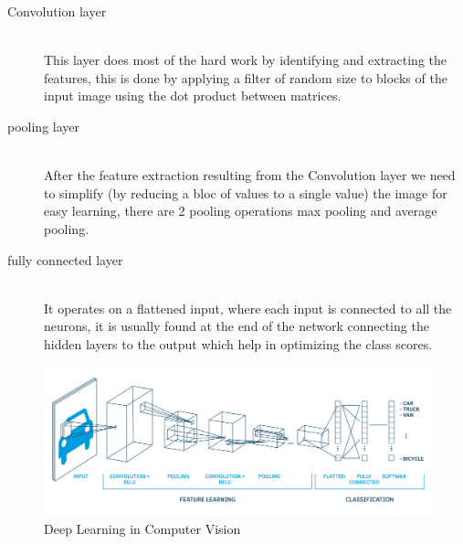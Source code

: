        \begin{description}
        \item[Convolution layer] \hfill \\
            This layer does most of the hard work by identifying and extracting the features, this is done by applying a filter of random size to blocks of the input image using the dot product between matrices.
        \item[pooling layer] \hfill \\ 
            After the feature extraction resulting from the Convolution layer we need to simplify (by reducing a bloc of values to a single value) the image for easy learning, there are 2 pooling operations max pooling and average pooling.
        \item[fully connected layer] \hfill \\
            It operates on a flattened input, where each input is connected to all the neurons, it is usually found at the end of the network connecting the hidden layers to the output which help in optimizing the class scores.
        \end{description}
        \begin{figure}[htbp]
        \begin{center}
        \includegraphics[width=15cm]{./chapter-02-general-ai-information/cnn.png}
        \end{center}
        \caption{Deep Learning in Computer Vision ~\cite{mldlcv}}
        \label{fig:mldlcv}
        \end{figure}
    

